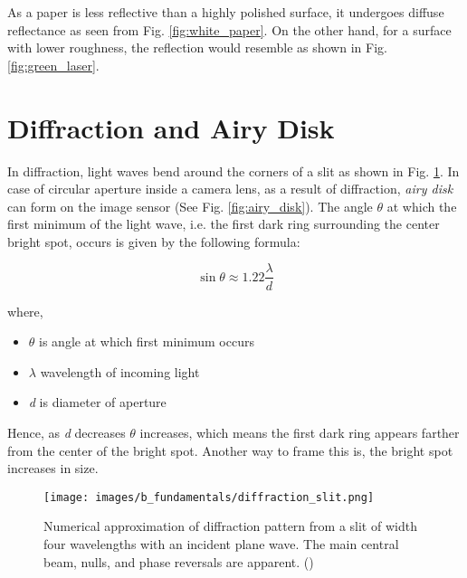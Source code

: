     \vspace{5mm}
    \noindent As a paper is less reflective than a highly polished surface, it undergoes diffuse reflectance as seen from Fig. \ref{fig:white_paper}. On the other hand, for a surface with lower roughness, the reflection would resemble as shown in Fig. \ref{fig:green_laser}.

    \clearpage

    \section*{Diffraction and Airy Disk}\label{section:diffraction}

    In diffraction, light waves bend around the corners of a slit as shown in Fig. \ref{fig:diffraction_slit}. In case of circular aperture inside a camera lens, as a result of diffraction, \emph{airy disk} can form on the image sensor (See Fig. \ref{fig:airy_disk}). The angle $\theta$ at which the first minimum of the light wave, i.e. the first dark ring surrounding the center bright spot, occurs is given by the following formula:

    \vspace{5mm}
    \begin{equation}\label{eqn:objective}
        \sin \theta \approx 1.22 \frac{\lambda}{d}
    \end{equation}

    \vspace{5mm}
    \noindent where,
    \begin{itemize}
        \item $\theta$ is angle at which first minimum occurs
        \item $\lambda$ wavelength of incoming light
        \item \emph{d} is diameter of aperture
    \end{itemize}
    
    \vspace{5mm}
    \noindent Hence, as \emph{d} decreases $\theta$ increases, which means the first dark ring appears farther from the center of the bright spot. Another way to frame this is, the bright spot increases in size.

    \begin{figure}[h]
        \centering
        \texttt{[image: images/b\_fundamentals/diffraction\_slit.png]}
        \caption{Numerical approximation of diffraction pattern from a slit of width four wavelengths with an incident plane wave. The main central beam, nulls, and phase reversals are apparent. (\cite{img_diffraction_slit})}
        \label{fig:diffraction_slit}
    \end{figure}

